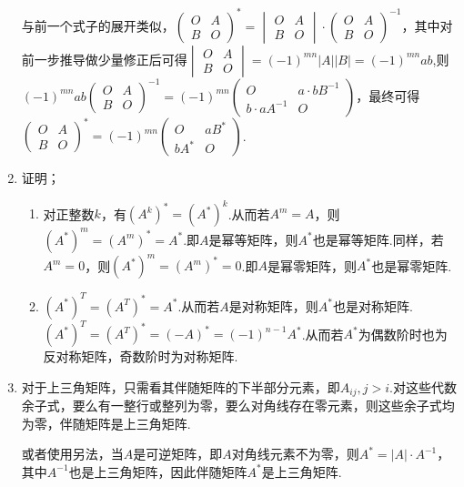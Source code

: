 \begin{enumerate}
    与前一个式子的展开类似，$\begin{pmatrix}
        O & A \\ B & O
    \end{pmatrix}^*=\begin{vmatrix}
        O & A \\ B & O
    \end{vmatrix}\cdot \begin{pmatrix}
        O & A \\ B & O
    \end{pmatrix}^{-1}$，其中对前一步推导做少量修正后可得$\begin{vmatrix}
        O & A \\ B & O
    \end{vmatrix}=(-1)^{mn}|A||B|=(-1)^{mn}ab$,则$(-1)^{mn}ab\begin{pmatrix}
        O & A \\ B & O
    \end{pmatrix}^{-1}=(-1)^{mn}\begin{pmatrix}
        O & a\cdot bB^{-1} \\ b\cdot aA^{-1} & O
    \end{pmatrix}$，最终可得$\begin{pmatrix}
        O & A \\ B & O
    \end{pmatrix}^*=(-1)^{mn}\begin{pmatrix}
        O & aB^* \\ bA^* & O
    \end{pmatrix}$.
    \item 证明；\begin{enumerate}
        \item 对正整数$k$，有$(A^k)^*=(A^*)^k$.从而若$A^m=A$，则$(A^*)^m=(A^m)^*=A^*$.即$A$是幂等矩阵，则$A^*$也是幂等矩阵.同样，若$A^m=0$，则$(A^*)^m=(A^m)^*=0$.即$A$是幂零矩阵，则$A^*$也是幂零矩阵.
        \item $(A^*)^T=(A^T)^*=A^*$.从而若$A$是对称矩阵，则$A^*$也是对称矩阵.$(A^*)^T=(A^T)^*=(-A)^*=(-1)^{n-1}A^*$.从而若$A^*$为偶数阶时也为反对称矩阵，奇数阶时为对称矩阵.
    \end{enumerate}
    \item 对于上三角矩阵，只需看其伴随矩阵的下半部分元素，即$A_{ij},j>i$.对这些代数余子式，要么有一整行或整列为零，要么对角线存在零元素，则这些余子式均为零，伴随矩阵是上三角矩阵.\par 或者使用另法，当$A$是可逆矩阵，即$A$对角线元素不为零，则$A^*=|A|\cdot A^{-1}$，其中$A^{-1}$也是上三角矩阵，因此伴随矩阵$A^*$是上三角矩阵.

\end{enumerate}
